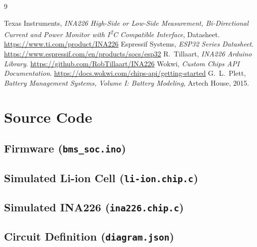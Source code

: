 \documentclass[12pt,a4paper,oneside]{report}
\begin{document}
\begin{thebibliography}{9}
 Texas Instruments, \emph{INA226 High-Side or Low-Side Measurement, Bi-Directional Current and Power Monitor with I\textsuperscript{2}C Compatible Interface}, Datasheet. \url{https://www.ti.com/product/INA226}
 Espressif Systems, \emph{ESP32 Series Datasheet}. \url{https://www.espressif.com/en/products/socs/esp32}
 R.\ Tillaart, \emph{INA226 Arduino Library}. \url{https://github.com/RobTillaart/INA226}
 Wokwi, \emph{Custom Chips API Documentation}. \url{https://docs.wokwi.com/chips-api/getting-started}
 G.\ L.\ Plett, \emph{Battery Management Systems, Volume I: Battery Modeling}, Artech House, 2015.
\end{thebibliography}

\appendix
\chapter{Source Code}

\section{Firmware (\texttt{bms\_soc.ino})}


\section{Simulated Li-ion Cell (\texttt{li-ion.chip.c})}


\section{Simulated INA226 (\texttt{ina226.chip.c})}


\section{Circuit Definition (\texttt{diagram.json})}

\end{document}
